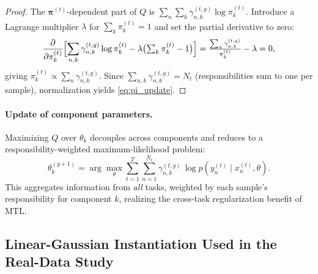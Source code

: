 \documentclass[preprint,12pt]{elsarticle}
\begin{document}
	\begin{proof}
		The $\bm{\pi}^{(t)}$-dependent part of $Q$ is
		$\sum_n \sum_k \gamma_{n,k}^{(t,g)} \log\pi_k^{(t)}$.
		Introduce a Lagrange multiplier $\lambda$ for $\sum_k \pi_k^{(t)}=1$
		and set the partial derivative to zero:
		\[
		\frac{\partial}{\partial \pi_k^{(t)}}
		\Bigl[\sum_{n,k} \gamma_{n,k}^{(t,g)}\log\pi_k^{(t)}
		- \lambda\bigl(\textstyle\sum_k\pi_k^{(t)}-1\bigr)\Bigr]
		= \frac{\sum_n \gamma_{n,k}^{(t,g)}}{\pi_k^{(t)}} - \lambda = 0,
		\]
		giving $\pi_k^{(t)} \propto \sum_n \gamma_{n,k}^{(t,g)}$.
		Since $\sum_{n,k} \gamma_{n,k}^{(t,g)} = N_t$ (responsibilities
		sum to one per sample), normalization yields \eqref{eq:pi_update}.
	\end{proof}
	
	\paragraph{Update of component parameters.}
	
	Maximizing $Q$ over $\theta_k$ decouples across components and reduces
	to a responsibility-weighted maximum-likelihood problem:
	\begin{equation}
		\theta_k^{(g+1)}
		= \arg\max_{\theta}
		\sum_{t=1}^T \sum_{n=1}^{N_t}
		\gamma_{n,k}^{(t,g)}\,
		\log p\!\left(y_n^{(t)}\mid x_n^{(t)},\theta\right).
		\label{eq:theta_update}
	\end{equation}
	This aggregates information from \emph{all} tasks, weighted by each
	sample's responsibility for component $k$, realizing the cross-task
	regularization benefit of MTL.
	
	\subsection{Linear-Gaussian Instantiation Used in the Real-Data Study}
	\label{sec:linear_gaussian}
	
\end{document}
